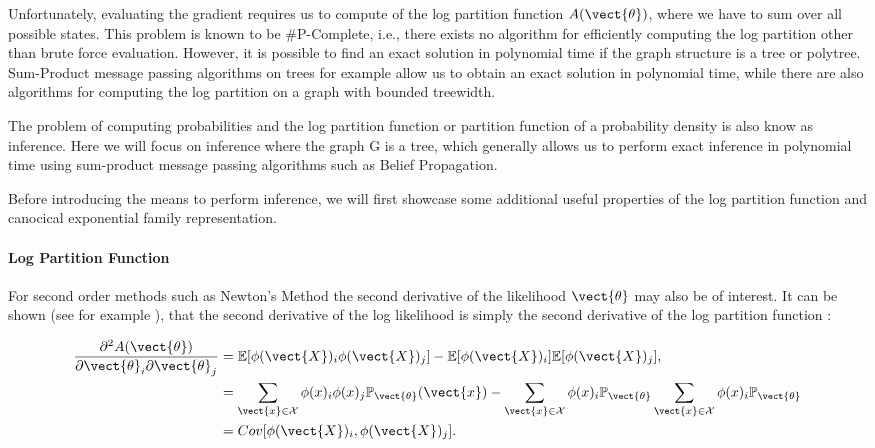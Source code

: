     Unfortunately, evaluating the gradient requires us to compute of the log partition function $A(\vect{\theta})$, where we have to sum over all possible states.
    This problem is known to be \#P-Complete, i.e., there exists no algorithm for efficiently computing the log partition other than brute force evaluation.
    However, it is possible to find an exact solution in polynomial time if the graph structure is a tree or polytree.
    Sum-Product message passing algorithms on trees for example allow us to obtain an exact solution in polynomial time, while there are also algorithms for computing the log partition on a graph with bounded treewidth\cite{berg2014learning}.

    The problem of computing probabilities and the log partition function or partition function of a probability density is also know as inference.
    Here we will focus on inference where the graph G is a tree, which generally allows us to perform exact inference in polynomial time using sum-product message passing algorithms such as Belief Propagation.

    Before introducing the means to perform inference, we will first showcase some additional useful properties of the log partition function and canocical exponential family representation.
    
    \paragraph*{Log Partition Function}
    For second order methods such as Newton's Method the second derivative of the likelihood \wrt $\vect{\theta}$ may also be of interest.
    It can be shown (see for example \cite{piatkowski2018exponential}), that the second derivative of the log likelihood is simply the second derivative of the log partition function :

    \begin{equation}
        \label{eq:sparsefish}
        \begin{split}
        \frac{\partial^2 A(\vect{\theta})}{\partial \vect{\theta}_i \partial \vect{\theta}_j} &= \mathbb{E}[\phi(\vect{X})_i \phi(\vect{X})_j] - \mathbb{E}[\phi(\vect{X})_i] \mathbb{E}[\phi(\vect{X})_j], \\
        &= \sum_{\vect{x} \in \mathcal{X}} \phi(x)_i \phi(x)_j \mathbb{P}_{\vect{\theta}}(\vect{x}) - \sum_{\vect{x} \in \mathcal{X}} \phi(x)_i \mathbb{P}_{\vect{\theta}} \sum_{\vect{x} \in \mathcal{X}} \phi(x)_i  \mathbb{P}_{\vect{\theta}} \\
        &= Cov[\phi(\vect{X})_i, \phi(\vect{X})_j].
        \end{split}
    \end{equation}

